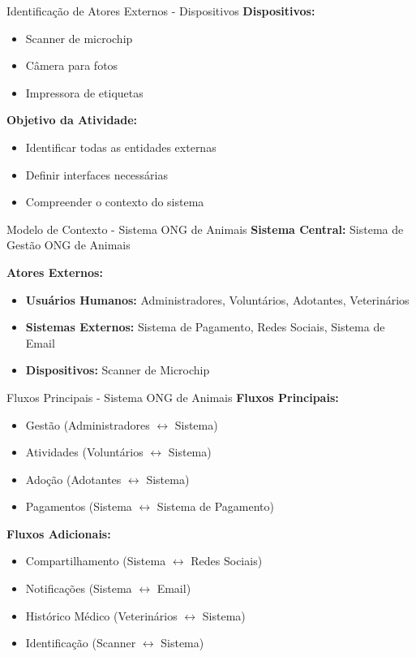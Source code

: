 \documentclass[aspectratio=169]{beamer}
\begin{document}
\begin{frame}{Identificação de Atores Externos - Dispositivos}
\textbf{Dispositivos:}
\begin{itemize}
\item Scanner de microchip
\item Câmera para fotos
\item Impressora de etiquetas
\end{itemize}

\vspace{0.5cm}
\textbf{Objetivo da Atividade:}
\begin{itemize}
\item Identificar todas as entidades externas
\item Definir interfaces necessárias
\item Compreender o contexto do sistema
\end{itemize}
\end{frame}

\begin{frame}{Modelo de Contexto - Sistema ONG de Animais}
\textbf{Sistema Central:} Sistema de Gestão ONG de Animais

\textbf{Atores Externos:}
\begin{itemize}
\item \textbf{Usuários Humanos:} Administradores, Voluntários, Adotantes, Veterinários
\item \textbf{Sistemas Externos:} Sistema de Pagamento, Redes Sociais, Sistema de Email
\item \textbf{Dispositivos:} Scanner de Microchip
\end{itemize}
\end{frame}

\begin{frame}{Fluxos Principais - Sistema ONG de Animais}
\textbf{Fluxos Principais:}
\begin{itemize}
\item Gestão (Administradores $\leftrightarrow$ Sistema)
\item Atividades (Voluntários $\leftrightarrow$ Sistema)
\item Adoção (Adotantes $\leftrightarrow$ Sistema)
\item Pagamentos (Sistema $\leftrightarrow$ Sistema de Pagamento)
\end{itemize}

\vspace{0.3cm}
\textbf{Fluxos Adicionais:}
\begin{itemize}
\item Compartilhamento (Sistema $\leftrightarrow$ Redes Sociais)
\item Notificações (Sistema $\leftrightarrow$ Email)
\item Histórico Médico (Veterinários $\leftrightarrow$ Sistema)
\item Identificação (Scanner $\leftrightarrow$ Sistema)
\end{itemize}
\end{frame}
\end{document}
